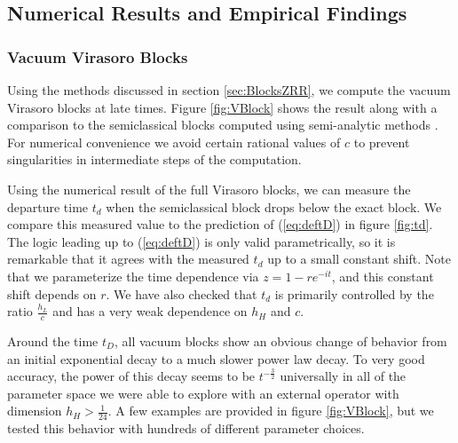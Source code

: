 \subsection{Numerical Results and Empirical Findings}

\subsubsection{Vacuum Virasoro Blocks}

Using the methods discussed in section \ref{sec:BlocksZRR}, we compute the vacuum Virasoro blocks at late times. Figure \ref{fig:VBlock} shows the result along with a comparison to the semiclassical blocks computed using semi-analytic methods \cite{Fitzpatrick:2016mjq}.   For numerical convenience we avoid certain rational values of $c$ to prevent singularities in intermediate steps of the computation. 

Using the numerical result of the full Virasoro blocks, we can measure the departure time $t_d$ when the semiclassical block drops below the exact block. We compare this measured value to the prediction of (\ref{eq:deftD}) in figure \ref{fig:td}.  The logic leading up to  (\ref{eq:deftD}) is only valid parametrically, so it is remarkable that it agrees with the measured $t_d$ up to a small constant shift.  Note that we parameterize the time dependence via $z = 1 - r e^{-it}$, and this constant shift depends on $r$.  We have also checked that $t_d$ is primarily controlled by the ratio $\frac{h_L}{c}$ and has a very weak dependence on  $h_H$ and $c$.  

Around the time  $t_D$, all vacuum blocks show an obvious change of behavior from an initial exponential decay to a much slower power law decay.  To very good accuracy, the power of this decay seems to be $t^{-\frac{3}{2}}$ universally in all of the parameter space we were able to explore with an external operator with dimension $h_H>\frac{1}{24}$.  A few examples are provided in figure \ref{fig:VBlock}, but we tested this behavior with hundreds of different parameter choices.


